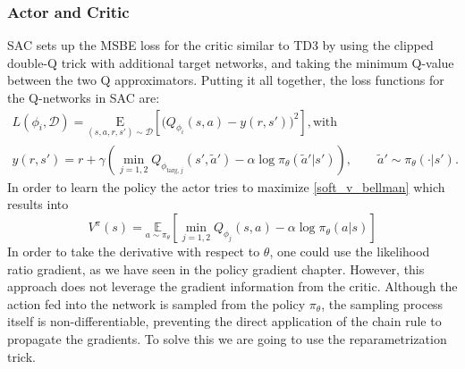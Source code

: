 \subsubsection{Actor and Critic}
SAC sets up the MSBE loss for the critic similar to TD3 by using the clipped double-Q trick with additional target networks,
and taking the minimum Q-value between the two Q approximators. Putting it all together, the loss functions for the Q-networks 
in SAC are:
\begin{gather*}
L(\phi_i, {\mathcal D}) = \underset{(s,a,r,s') \sim {\mathcal D}}{{\mathrm E}}\left[
    \Bigg( Q_{\phi_i}(s,a) - y(r,s') \Bigg)^2
    \right], \text{with} \\
y(r, s') = r + \gamma \left( \min_{j=1,2} Q_{\phi_{\text{targ},j}}(s', \tilde{a}') - \alpha \log \pi_{\theta}(\tilde{a}'|s') \right), \qquad \tilde{a}' \sim \pi_{\theta}(\cdot|s').
\end{gather*}
In order to learn the policy the actor tries to maximize \eqref{soft_v_bellman} which results into
$$ V^\pi(s)= \underset{a\sim \pi_\theta}{\mathbb{E}}[{ \min_{j=1,2} Q_{\phi_j}(s,a) - \alpha \log \pi_\theta(a|s)}]$$ 
In order to take the derivative with respect to $\theta$, one could use the likelihood ratio gradient, as we have seen 
in the policy gradient chapter. However, this approach does not leverage the gradient information from the critic.
Although the action fed into the network is sampled from the policy $\pi_\theta$, the sampling process itself is non-differentiable, 
preventing the direct application of the chain rule to propagate the gradients. To solve this we are going to use the reparametrization 
trick. 

